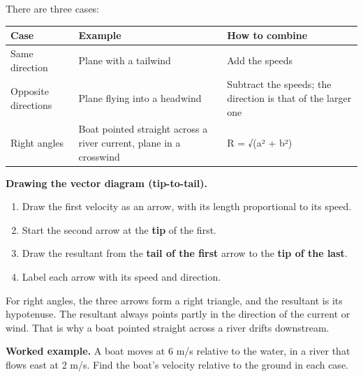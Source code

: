 \documentclass[
]{article}
\newcounter{none} %
\providecommand{\tightlist}{%
  \setlength{\itemsep}{0pt}\setlength{\parskip}{0pt}}
\begin{document}
There are three cases:

{\def\LTcaptype{none} %
\begin{longtable}[]{@{}
  >{\raggedright\arraybackslash}p{}
  >{\raggedright\arraybackslash}p{}
  >{\raggedright\arraybackslash}p{}@{}}
\toprule\noalign{}
\begin{minipage}[b]{\linewidth}\raggedright
Case
\end{minipage} & \begin{minipage}[b]{\linewidth}\raggedright
Example
\end{minipage} & \begin{minipage}[b]{\linewidth}\raggedright
How to combine
\end{minipage} \\
\midrule\noalign{}
\endhead
\bottomrule\noalign{}
\endlastfoot
Same direction & Plane with a tailwind & Add the speeds \\
Opposite directions & Plane flying into a headwind & Subtract the
speeds; the direction is that of the larger one \\
Right angles & Boat pointed straight across a river current, plane in a
crosswind & R = √(a² + b²) \\
\end{longtable}
}

\textbf{Drawing the vector diagram (tip-to-tail).}

\begin{enumerate}
\def\labelenumi{\arabic{enumi}.}
\tightlist
\item
  Draw the first velocity as an arrow, with its length proportional to
  its speed.
\item
  Start the second arrow at the \textbf{tip} of the first.
\item
  Draw the resultant from the \textbf{tail of the first} arrow to the
  \textbf{tip of the last}.
\item
  Label each arrow with its speed and direction.
\end{enumerate}

For right angles, the three arrows form a right triangle, and the
resultant is its hypotenuse. The resultant always points partly in the
direction of the current or wind. That is why a boat pointed straight
across a river drifts downstream.

\textbf{Worked example.} A boat moves at 6 m/s relative to the water, in
a river that flows east at 2 m/s. Find the boat's velocity relative to
the ground in each case.
\end{document}
